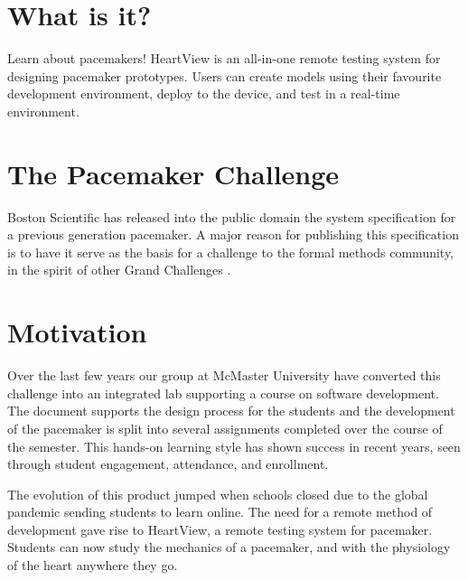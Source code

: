 \documentclass[11pt,fleqn]{book} %
\begin{document}
\section{What is it?}

Learn about pacemakers! HeartView is an all-in-one remote testing system for designing pacemaker prototypes. Users can create models using their favourite development environment, deploy to the device, and test in a real-time environment. 



\section{The Pacemaker Challenge}

Boston Scientific has released into the public domain the system specification for a previous generation pacemaker. A major reason for publishing this specification is to have it serve as the basis for a challenge to the formal methods community, in the spirit of other Grand Challenges \cite{sqrl_pacemaker}.



\section{Motivation}

Over the last few years our group at McMaster University have converted this challenge into an integrated lab supporting a course on software development. The document supports the design process for the students and the development of the pacemaker is split into several assignments completed over the course of the semester. This hands-on learning style has shown success in recent years, seen through student engagement, attendance, and enrollment.

The evolution of this product jumped when schools closed due to the global pandemic sending students to learn online. The need for a remote method of development gave rise to HeartView, a remote testing system for pacemaker. Students can now study the mechanics of a pacemaker, and with the physiology of the heart anywhere they go.




\end{document}
